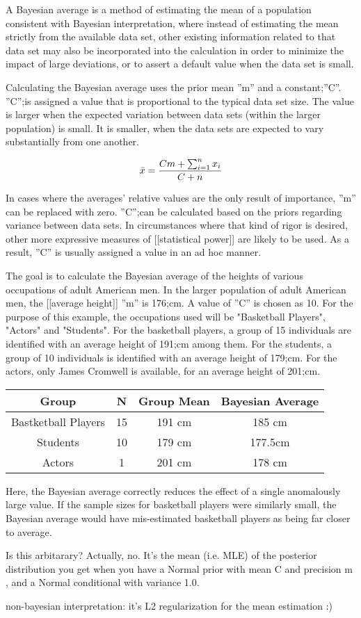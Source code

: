 A Bayesian average is a method of estimating the mean of a population consistent with Bayesian interpretation, where instead of estimating the mean strictly from the available data set, other existing information related to that data set may also be incorporated into the calculation in order to minimize the impact of large deviations, or to assert a default value when the data set is small.

Calculating the Bayesian average uses the prior mean ''m'' and a constant;''C''. ''C'';is assigned a value that is proportional to the typical data set size. The value is larger when the expected variation between data sets (within the larger population) is small. It is smaller, when the data sets are expected to vary substantially from one another.

\[  \bar{x} = {Cm + \sum_{i=1}^n{x_i} \over C + n}  \]

In cases where the averages' relative values are the only result of importance, ''m'' can be replaced with zero. ''C'';can be calculated based on the priors regarding variance between data sets. In circumstances where that kind of rigor is desired, other more expressive measures of [[statistical power]] are likely to be used. As a result, ''C'' is usually assigned a value in an ad hoc manner.

The goal is to calculate the Bayesian average of the heights of various occupations of adult American men. In the larger population of adult American men, the [[average height]] ''m'' is 176;cm. A value of ''C'' is chosen as 10. For the purpose of this example, the occupations used will be "Basketball Players", "Actors" and "Students". For the basketball players, a group of 15 individuals are identified with an average height of 191;cm among them. For the students, a group of 10 individuals is identified with an average height of 179;cm. For the actors, only James Cromwell is available, for an average height of 201;cm.


\begin{tabular}{|c|c|c|c|}
	\hline Group & N & Group Mean & Bayesian Average \\ 
	\hline Bastketball Players & 15 & 191 cm & 185 cm \\ 
	\hline Students & 10 & 179 cm & 177.5cm \\ 
	\hline Actors & 1 & 201 cm & 178 cm \\ 
	\hline 
\end{tabular} 
Here, the Bayesian average correctly reduces the effect of a single anomalously large value. If the sample sizes for basketball players were similarly small, the Bayesian average would have mis-estimated basketball players as being far closer to average.

Is this arbitarary? Actually, no. It’s the mean (i.e. MLE) of the posterior distribution you get when you have a Normal prior with mean C  and precision m , and a Normal conditional with variance 1.0.


non-bayesian interpretation: it’s L2 regularization for the mean estimation :)
